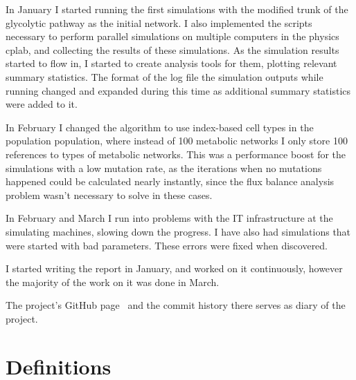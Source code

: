\documentclass[a4paper,12pt]{article}
\begin{document}
	In January I started running the first simulations with the modified trunk of the glycolytic pathway as the initial network. I also implemented the scripts necessary to perform parallel simulations on multiple computers in the physics cplab, and collecting the results of these simulations. 
	As the simulation results started to flow in, I started to create analysis tools for them, plotting relevant summary statistics. The format of the log file the simulation outputs while running changed and expanded during this time as additional summary statistics were added to it. 

	In February I changed the algorithm to use index-based cell types in the population population, where instead of 100 metabolic networks I only store 100 references to types of metabolic networks. This was a performance boost for the simulations with a low mutation rate, as the iterations when no mutations happened could be calculated nearly instantly, since the flux balance analysis problem wasn't necessary to solve in these cases. 

	In February and March I run into problems with the IT infrastructure at the simulating machines, slowing down the progress. I have also had simulations that were started with bad parameters. These errors were fixed when discovered. 

	I started writing the report in January, and worked on it continuously, however the majority of the work on it was done in March. 

	The project's GitHub page \cite{owngithub}~and the commit history there serves as diary of the project. 
	\cleardoublepage
	\section*{Definitions}
\end{document}
